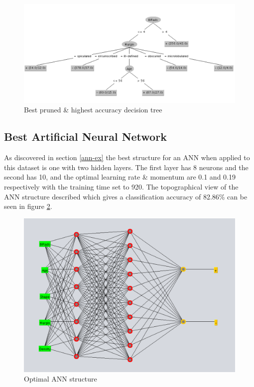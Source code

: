 \documentclass[12pt]{article}
\begin{document}
    \begin{figure}[H]
      \centering
      \includegraphics[width=\textwidth]{best-pruned-tree}
      \caption{Best pruned \& highest accuracy decision tree}
      \label{fig:best-pruned-tree}
    \end{figure}

  \subsection{Best Artificial Neural Network}
    As discovered in section \ref{ann-ex} the best structure for an ANN when applied to this dataset is one with two hidden layers. The first layer has 8 neurons and the second has 10, and the optimal learning rate \& momentum are 0.1 and 0.19 respectively with the training time set to 920. The topographical view of the ANN structure described which gives a classification accuracy of 82.86\% can be seen in figure \ref{fig:ann-optimal-structure}.

    \begin{figure}[H]
      \centering
      \includegraphics[width=\textwidth]{ann-optimal-structure}
      \caption{Optimal ANN structure}
      \label{fig:ann-optimal-structure}
    \end{figure}
\end{document}

